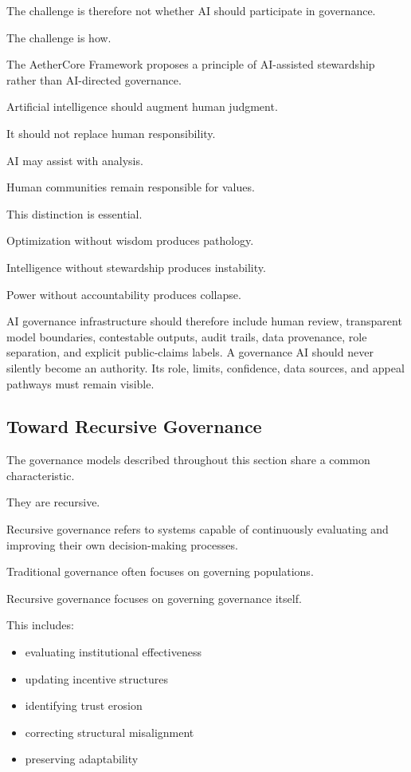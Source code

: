 \documentclass[12pt]{article}
\begin{document}
The challenge is therefore not whether AI should participate in governance.

The challenge is how.

The AetherCore Framework proposes a principle of AI-assisted stewardship rather than AI-directed governance.

Artificial intelligence should augment human judgment.

It should not replace human responsibility.

AI may assist with analysis.

Human communities remain responsible for values.

This distinction is essential.

Optimization without wisdom produces pathology.

Intelligence without stewardship produces instability.

Power without accountability produces collapse.

AI governance infrastructure should therefore include human review, transparent model boundaries, contestable outputs, audit trails, data provenance, role separation, and explicit public-claims labels. A governance AI should never silently become an authority. Its role, limits, confidence, data sources, and appeal pathways must remain visible.

\subsection{Toward Recursive Governance}

The governance models described throughout this section share a common characteristic.

They are recursive.

Recursive governance refers to systems capable of continuously evaluating and improving their own decision-making processes.

Traditional governance often focuses on governing populations.

Recursive governance focuses on governing governance itself.

This includes:

\begin{itemize}
  \item evaluating institutional effectiveness
  \item updating incentive structures
  \item identifying trust erosion
  \item correcting structural misalignment
  \item preserving adaptability
\end{itemize}
\end{document}
